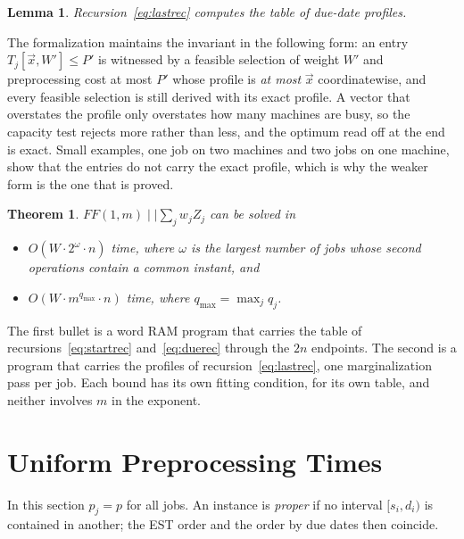 \documentclass[11pt,a4paper]{article}
\newtheorem{theorem}{Theorem}
\newtheorem{lemma}{Lemma}
\theoremstyle{definition}
\theoremstyle{plain}
\newcommand{\FF}{FF(1,m)\mid\mid\textstyle\sum_j w_jZ_j}
\newcommand{\qmax}{q_{\max}}
\newcommand{\vecx}{\vec{x}}
\begin{document}
\begin{lemma}\label{lem:qmax}
Recursion~\eqref{eq:lastrec} computes the table of due-date profiles.
\end{lemma}
The formalization maintains the invariant in the following form: an entry
$T_j[\vecx,W']\le P'$ is witnessed by a feasible selection of weight $W'$ and preprocessing cost
at most $P'$ whose profile is \emph{at most} $\vecx$ coordinatewise, and every feasible
selection is still derived with its exact profile. A vector that overstates the profile only
overstates how many machines are busy, so the capacity test rejects more rather than less, and
the optimum read off at the end is exact. Small examples, one job on two machines and two jobs
on one machine, show that the entries do not carry the exact profile, which is why the weaker form
is the one that is proved.

\setcounter{theorem}{2}
\begin{theorem}\label{thm:secondaryDPs}
$\FF$ can be solved in
\begin{itemize}
\item $O(W\cdot2^{\omega}\cdot n)$ time, where $\omega$ is the largest number of jobs whose
  second operations contain a common instant, and
\item $O(W\cdot m^{\qmax}\cdot n)$ time, where $\qmax=\max_jq_j$.
\end{itemize}
\end{theorem}
The first bullet is a word RAM program that carries the table of
recursions~\eqref{eq:startrec} and~\eqref{eq:duerec} through the $2n$ endpoints.
The second is a program that carries the profiles of recursion~\eqref{eq:lastrec}, one
marginalization pass per job. Each bound has its own fitting condition, for its own table, and
neither involves $m$ in the exponent.

\section{Uniform Preprocessing Times}\label{sec:uniform}

In this section $p_j=p$ for all jobs. An instance is \emph{proper} if no interval $[s_i,d_i)$ is
contained in another; the EST order and the order by due dates then coincide.
\end{document}
